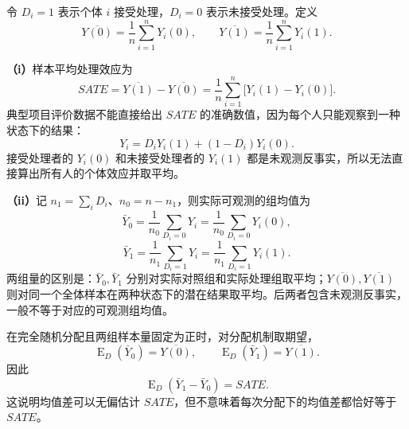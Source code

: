 \documentclass[UTF8,a4paper,11pt,fontset=fandol]{ctexart}
\newcommand{\E}{\operatorname{E}}
\newcommand{\subq}[1]{\par\medskip\noindent\textbf{（#1）}\enspace}
\begin{document}
令 $D_i=1$ 表示个体 $i$ 接受处理，$D_i=0$ 表示未接受处理。定义
\[
\overline{Y(0)}=\frac1n\sum_{i=1}^nY_i(0),\qquad
\overline{Y(1)}=\frac1n\sum_{i=1}^nY_i(1).
\]
\subq{i}样本平均处理效应为
\[
SATE=\overline{Y(1)}-\overline{Y(0)}
=\frac1n\sum_{i=1}^n\bigl[Y_i(1)-Y_i(0)\bigr].
\]
典型项目评价数据不能直接给出 $SATE$ 的准确数值，因为每个人只能观察到一种状态下的结果：
\[
Y_i=D_iY_i(1)+(1-D_i)Y_i(0).
\]
接受处理者的 $Y_i(0)$ 和未接受处理者的 $Y_i(1)$ 都是未观测反事实，所以无法直接算出所有人的个体效应并取平均。

\subq{ii}记 $n_1=\sum_iD_i$、$n_0=n-n_1$，则实际可观测的组均值为
\[
\bar Y_0=\frac1{n_0}\sum_{D_i=0}Y_i
=\frac1{n_0}\sum_{D_i=0}Y_i(0),
\]
\[
\bar Y_1=\frac1{n_1}\sum_{D_i=1}Y_i
=\frac1{n_1}\sum_{D_i=1}Y_i(1).
\]
两组量的区别是：$\bar Y_0,\bar Y_1$ 分别对实际对照组和实际处理组取平均；$\overline{Y(0)},\overline{Y(1)}$ 则对同一个全体样本在两种状态下的潜在结果取平均。后两者包含未观测反事实，一般不等于对应的可观测组均值。

在完全随机分配且两组样本量固定为正时，对分配机制取期望，
\[
\E_D(\bar Y_0)=\overline{Y(0)},\qquad
\E_D(\bar Y_1)=\overline{Y(1)}.
\]
因此
\[
\E_D(\bar Y_1-\bar Y_0)=SATE.
\]
这说明均值差可以无偏估计 $SATE$，但不意味着每次分配下的均值差都恰好等于 $SATE$。
\end{document}

